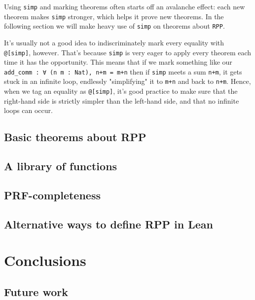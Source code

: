 \documentclass{book}
\theoremstyle{definition}
\theoremstyle{remark}
\theoremstyle{plain}
\begin{document}
Using \lstinline{simp} and marking theorems often starts off an avalanche effect:
each new theorem makes \lstinline{simp} stronger, which helps it prove new theorems.
In the following section we will make heavy use of \lstinline{simp} on theorems about \lstinline{RPP}.

It's usually not a good idea to indiscriminately mark every equality with \lstinline{@[simp]}, however.
That's because \lstinline{simp} is very eager to apply every theorem each time it has the opportunity.
This means that if we mark something like our \lstinline{add_comm : ∀ (n m : Nat), n+m = m+n}
then if \lstinline{simp} meets a sum \lstinline{n+m}, it gets stuck in an infinite loop,
endlessly "simplifying" it to \lstinline{m+n} and back to \lstinline{n+m}.
Hence, when we tag an equality as \lstinline{@[simp]},
it's good practice to make sure that the right-hand side is strictly simpler than the left-hand side,
and that no infinite loops can occur.

\section{Basic theorems about RPP}

\section{A library of functions}

\section{PRF-completeness}

\section{Alternative ways to define RPP in Lean}

\chapter{Conclusions}

\section{Future work}
\end{document}
